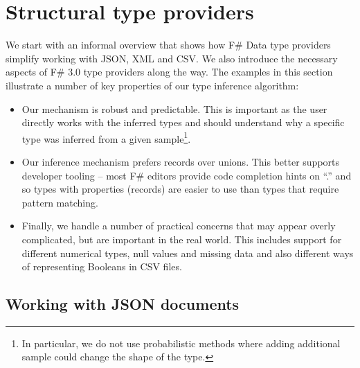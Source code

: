 \documentclass[preprint]{sigplanconf}
\newcommand{\kvd}[1]{\textnormal{\textcolor{kvdclr}{\sffamily #1}}}
\begin{document}
\section{Structural type providers}
\label{sec:providers}

We start with an informal overview that shows how F\# Data type providers simplify working with 
JSON, XML and CSV. We also introduce the necessary aspects of F\# 3.0 type providers along the 
way. The examples in this section illustrate a number of key properties of our type inference 
algorithm:

\begin{itemize}
\item Our mechanism is robust and predictable. This is important as the user directly works with 
  the inferred types and should understand why a specific type was inferred from a given 
  sample\footnote{In particular, we do not use probabilistic methods where adding additional 
  sample could change the shape of the type.}.

\item Our inference mechanism prefers records over unions. This better supports developer tooling --
  most F\# editors provide code completion hints on ``.'' and so types with properties (records)
  are easier to use than types that require pattern matching.

\item Finally, we handle a number of practical concerns that may appear overly complicated, but
  are important in the real world. This includes support for different numerical types, \kvd{null}
  values and missing data and also different ways of representing Booleans in CSV files.
\end{itemize}


\subsection{Working with JSON documents}
\label{sec:providers-json}
\end{document}
